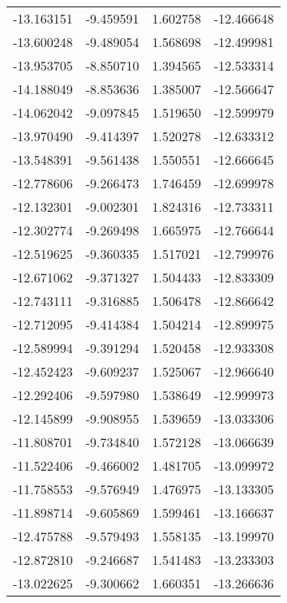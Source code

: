 \begin{tabular}{rrrr}
      -13.163151 &        -9.459591 &    1.602758 & -12.466648 \\
      -13.600248 &        -9.489054 &    1.568698 & -12.499981 \\
      -13.953705 &        -8.850710 &    1.394565 & -12.533314 \\
      -14.188049 &        -8.853636 &    1.385007 & -12.566647 \\
      -14.062042 &        -9.097845 &    1.519650 & -12.599979 \\
      -13.970490 &        -9.414397 &    1.520278 & -12.633312 \\
      -13.548391 &        -9.561438 &    1.550551 & -12.666645 \\
      -12.778606 &        -9.266473 &    1.746459 & -12.699978 \\
      -12.132301 &        -9.002301 &    1.824316 & -12.733311 \\
      -12.302774 &        -9.269498 &    1.665975 & -12.766644 \\
      -12.519625 &        -9.360335 &    1.517021 & -12.799976 \\
      -12.671062 &        -9.371327 &    1.504433 & -12.833309 \\
      -12.743111 &        -9.316885 &    1.506478 & -12.866642 \\
      -12.712095 &        -9.414384 &    1.504214 & -12.899975 \\
      -12.589994 &        -9.391294 &    1.520458 & -12.933308 \\
      -12.452423 &        -9.609237 &    1.525067 & -12.966640 \\
      -12.292406 &        -9.597980 &    1.538649 & -12.999973 \\
      -12.145899 &        -9.908955 &    1.539659 & -13.033306 \\
      -11.808701 &        -9.734840 &    1.572128 & -13.066639 \\
      -11.522406 &        -9.466002 &    1.481705 & -13.099972 \\
      -11.758553 &        -9.576949 &    1.476975 & -13.133305 \\
      -11.898714 &        -9.605869 &    1.599461 & -13.166637 \\
      -12.475788 &        -9.579493 &    1.558135 & -13.199970 \\
      -12.872810 &        -9.246687 &    1.541483 & -13.233303 \\
      -13.022625 &        -9.300662 &    1.660351 & -13.266636 \\

\end{tabular}
